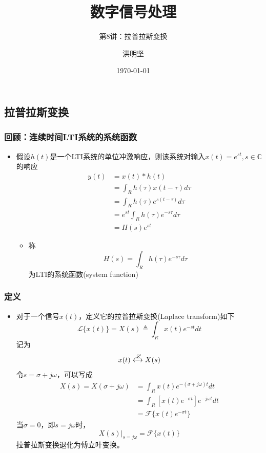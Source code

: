 \documentclass[CJKutf8,dvipsnames,table]{beamer}
\title{数字信号处理}
\subtitle{第8讲：拉普拉斯变换}
\author{洪明坚}
\institute{重庆大学软件学院}
\date{\today}
\newif\ifxetexorluatex %
\begin{document}
\ifxetexorluatex\else
\begin{CJK*}{UTF8}{song}  
\fi


  \frame{\titlepage}
  
  \section{拉普拉斯变换}
  
  \begin{frame}
    \frametitle{回顾：连续时间LTI系统的系统函数}
    \begin{itemize}
    \item 假设$h(t)$是一个LTI系统的单位冲激响应，则该系统对输入$x(t)=e^{st}, s \in \mathbb{C}$的响应
    	\begin{align*}
 		y(t) & = x(t) * h(t) \\
		& = \int_R h(\tau)x(t - \tau )d\tau \\
		& = \int_R h(\tau )e^{s(t-\tau )}d\tau    \\
		& = e^{st} \int_R h(\tau)e^{-s\tau}d\tau \\
		& = H(s)e^{st}
    	\end{align*}   
		\begin{itemize}
		\item 称\[ H(s) = \int_R h(\tau)e^{-s\tau}d\tau \] 为LTI的系统函数(system function)
		\end{itemize}
    \end{itemize}
  \end{frame}  
    
  \begin{frame}
    \frametitle{定义}
    \begin{itemize}
    \item 对于一个信号$x(t)$，定义它的拉普拉斯变换(Laplace transform)如下
    \[
	    \mathscr{L}\{x(t)\} = X(s) \triangleq \int_R x(t)e^{-st}dt
    \]
    记为
    \[
    	x(t) \xleftrightarrow{\mathscr{L}} X(s)
    \]
    令$s=\sigma + j\omega$，可以写成
    \begin{align*}
    	X(s) = X(\sigma + j\omega) & = \int_R x(t)e^{-(\sigma + j\omega)t}dt \\
	                        & = \int_R [x(t)e^{-\sigma t}] e^{-j\omega t}dt \\
	                        & = \mathscr{F}\{ x(t) e^{-\sigma t} \}
    \end{align*}    
    当$\sigma=0$，即$s=j\omega$时，
    \[
    	\left. X(s) \right\vert_{s=j\omega} = \mathscr{F}\{x(t)\}
    \]
    拉普拉斯变换退化为傅立叶变换。
    \end{itemize}
  \end{frame}  
      

\end{CJK*}
\end{document}
